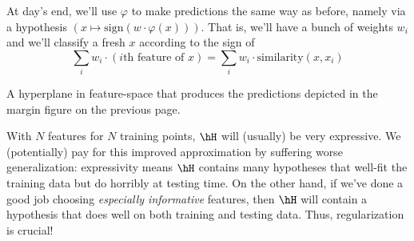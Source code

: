   At day's end, we'll use $\varphi$ to make predictions the same way as before,
  namely via a hypothesis $(x \mapsto \text{sign}(w \cdot \varphi(x)))$.  That
  is, we'll have a bunch of weights $w_i$ and we'll classify a fresh $x$
  according to the sign of
  $$
    \textstyle\sum_i w_i \cdot (\text{$i$th feature of $x$})
    =
    \sum_i w_i \cdot \text{similarity}(x, x_i)
  $$

\newpage
  \begin{marginfigure}%
      \centering
      \caption{
        A hyperplane in feature-space that produces the predictions depicted in
        the margin figure on the previous page.
      }
  \end{marginfigure}
  With $N$ features for $N$ training points, $\hH$ will (usually) be very
  expressive.
  We (potentially) pay for this improved approximation by suffering worse
  generalization:
  expressivity means $\hH$ contains many hypotheses that well-fit
  the training data but do horribly at testing time.
  On the other hand, if we've done a good job choosing \emph{especially
  informative} features, then $\hH$ will contain a hypothesis that does well on
  both training and testing data.
  Thus, regularization is crucial!


